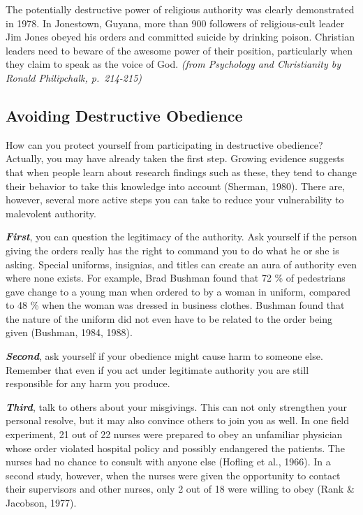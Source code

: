 \documentclass[
]{book}
\begin{document}
The potentially destructive power of religious authority was clearly demonstrated in 1978. In Jonestown, Guyana, more than 900 followers of religious-cult leader Jim Jones obeyed his orders and committed suicide by drinking poison. Christian leaders need to beware of the awesome power of their position, particularly when they claim to speak as the voice of God. \emph{(from Psychology and Christianity by Ronald Philipchalk, p.~214-215)}

\hypertarget{avoiding-destructive-obedience}{%
\subsection*{Avoiding Destructive Obedience}\label{avoiding-destructive-obedience}}

How can you protect yourself from participating in destructive obedience? Actually, you may have already taken the first step. Growing evidence suggests that when people learn about research findings such as these, they tend to change their behavior to take this knowledge into account (Sherman, 1980). There are, however, several more active steps you can take to reduce your vulnerability to malevolent authority.

\textbf{\emph{First}}, you can question the legitimacy of the authority. Ask yourself if the person giving the orders really has the right to command you to do what he or she is asking. Special uniforms, insignias, and titles can create an aura of authority even where none exists. For example, Brad Bushman found that 72 \% of pedestrians gave change to a young man when ordered to by a woman in uniform, compared to 48 \% when the woman was dressed in business clothes. Bushman found that the nature of the uniform did not even have to be related to the order being given (Bushman, 1984, 1988).

\textbf{\emph{Second}}, ask yourself if your obedience might cause harm to someone else. Remember that even if you act under legitimate authority you are still responsible for any harm you produce.

\textbf{\emph{Third}}, talk to others about your misgivings. This can not only strengthen your personal resolve, but it may also convince others to join you as well. In one field experiment, 21 out of 22 nurses were prepared to obey an unfamiliar physician whose order violated hospital policy and possibly endangered the patients. The nurses had no chance to consult with anyone else (Hofling et al., 1966). In a second study, however, when the nurses were given the opportunity to contact their supervisors and other nurses, only 2 out of 18 were willing to obey (Rank \& Jacobson, 1977).
\end{document}

